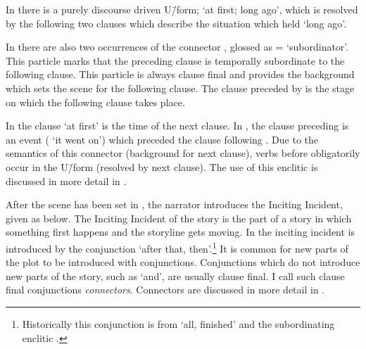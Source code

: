 In  there is a purely discourse
driven U\=/form;  `at first; long ago',
which is resolved by the following two clauses
which describe the situation which held `long ago'.

In  there are also two occurrences of
the connector , glossed as ={\te} `subordinator'.
This particle marks that the preceding clause is temporally
subordinate to the following clause.
This particle is always clause final and provides the background
which sets the scene for the following clause.
The clause preceded by  is the stage
on which the following clause takes place.

In  the clause  `at first'
is the time of the next clause.
In , the clause preceding 
is an event ( `it went on') which preceded the clause following .
Due to the semantics of this connector (background for next clause),
verbs before  obligatorily occur in the U\=/form (resolved by next clause).
The use of this enclitic is discussed in more detail in .

After the scene has been set in ,
the narrator introduces the Inciting Incident,
given as  below.
The Inciting Incident of the story is the part of a story
in which something first happens and the storyline gets moving.
In  the inciting incident is introduced
by the conjunction  `after that, then'.\footnote{
Historically this conjunction is from  `all, finished'
and the subordinating enclitic .}
It is common for new parts of the plot to be introduced with conjunctions.
Conjunctions which do not introduce new parts of the story,
such as  `and', are usually clause final.
I call such clause final conjunctions \emph{connectors}.
Connectors are discussed in more detail in .

\begin{exe}
	\label{ex:130823-2, 0.22-0.29}
	\begin{xlist}
		\label{ex:130823-2, 0.22}
		\label{ex:130823-2, 0.29}
	\end{xlist}
\end{exe}

